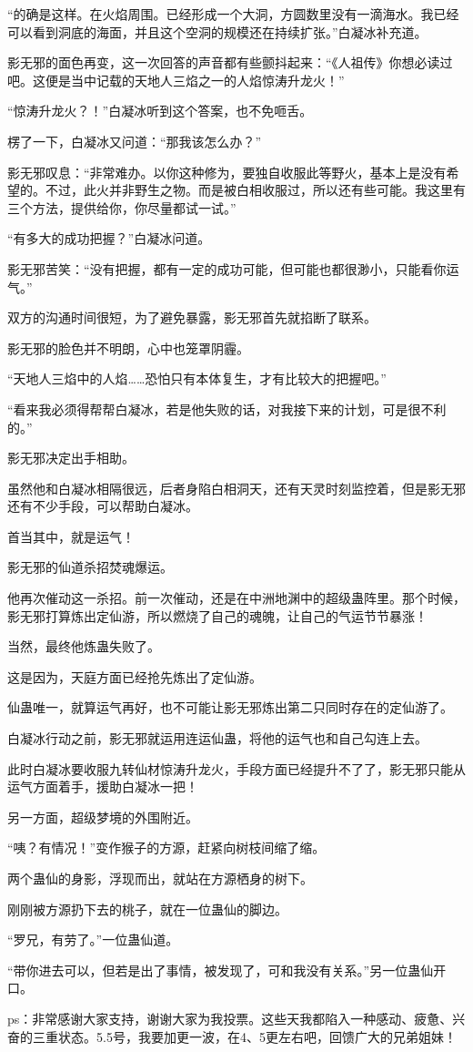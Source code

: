 \begin{this_body}
“的确是这样。在火焰周围。已经形成一个大洞，方圆数里没有一滴海水。我已经可以看到洞底的海面，并且这个空洞的规模还在持续扩张。”白凝冰补充道。

影无邪的面色再变，这一次回答的声音都有些颤抖起来：“《人祖传》你想必读过吧。这便是当中记载的天地人三焰之一的人焰惊涛升龙火！”

“惊涛升龙火？！”白凝冰听到这个答案，也不免咂舌。

楞了一下，白凝冰又问道：“那我该怎么办？”

影无邪叹息：“非常难办。以你这种修为，要独自收服此等野火，基本上是没有希望的。不过，此火并非野生之物。而是被白相收服过，所以还有些可能。我这里有三个方法，提供给你，你尽量都试一试。”

“有多大的成功把握？”白凝冰问道。

影无邪苦笑：“没有把握，都有一定的成功可能，但可能也都很渺小，只能看你运气。”

双方的沟通时间很短，为了避免暴露，影无邪首先就掐断了联系。

影无邪的脸色并不明朗，心中也笼罩阴霾。

“天地人三焰中的人焰……恐怕只有本体复生，才有比较大的把握吧。”

“看来我必须得帮帮白凝冰，若是他失败的话，对我接下来的计划，可是很不利的。”

影无邪决定出手相助。

虽然他和白凝冰相隔很远，后者身陷白相洞天，还有天灵时刻监控着，但是影无邪还有不少手段，可以帮助白凝冰。

首当其中，就是运气！

影无邪的仙道杀招焚魂爆运。

他再次催动这一杀招。前一次催动，还是在中洲地渊中的超级蛊阵里。那个时候，影无邪打算炼出定仙游，所以燃烧了自己的魂魄，让自己的气运节节暴涨！

当然，最终他炼蛊失败了。

这是因为，天庭方面已经抢先炼出了定仙游。

仙蛊唯一，就算运气再好，也不可能让影无邪炼出第二只同时存在的定仙游了。

白凝冰行动之前，影无邪就运用连运仙蛊，将他的运气也和自己勾连上去。

此时白凝冰要收服九转仙材惊涛升龙火，手段方面已经提升不了了，影无邪只能从运气方面着手，援助白凝冰一把！

另一方面，超级梦境的外围附近。

“咦？有情况！”变作猴子的方源，赶紧向树枝间缩了缩。

两个蛊仙的身影，浮现而出，就站在方源栖身的树下。

刚刚被方源扔下去的桃子，就在一位蛊仙的脚边。

“罗兄，有劳了。”一位蛊仙道。

“带你进去可以，但若是出了事情，被发现了，可和我没有关系。”另一位蛊仙开口。

ps：非常感谢大家支持，谢谢大家为我投票。这些天我都陷入一种感动、疲惫、兴奋的三重状态。5.5号，我要加更一波，在4、5更左右吧，回馈广大的兄弟姐妹！

\end{this_body}

